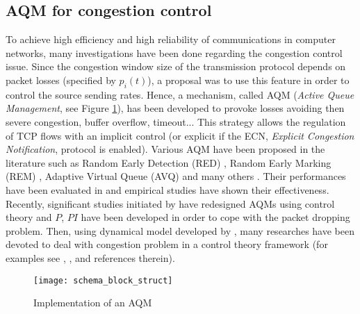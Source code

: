 \documentclass[a4paper, 10pt, onecolumn]{article}
\begin{document}
\subsection{AQM for congestion control}

To achieve high efficiency and high reliability of communications in computer networks, many investigations have been done regarding the congestion control issue. Since the congestion window size of the transmission protocol depends on packet losses (specified by $p_i(t)$), a proposal was to use this feature in order to control the source sending rates. Hence, a mechanism, called AQM ({\it Active Queue Management}, see Figure \ref{schema_block_struct}), has been developed to provoke losses avoiding then severe congestion, buffer overflow, timeout... This strategy allows the regulation of TCP flows with an implicit control (or explicit if the ECN, {\it Explicit Congestion Notification}, protocol is enabled). Various AQM have been proposed in the literature such as Random Early Detection (RED) \cite{Flo93}, Random Early Marking (REM) \cite{Ath00}, Adaptive Virtual Queue (AVQ) \cite{Sri04} and many others \cite{Ryu04}. Their performances have been evaluated in \cite{Ryu04} and empirical studies have shown their effectiveness. Recently, significant studies initiated by \cite{Hol02} have redesigned AQMs using control theory and $P$, $PI$ have been developed in order to cope with the packet dropping problem. Then, using dynamical model developed by \cite{Mis00}, many researches have been devoted to deal with congestion problem in a control theory framework (for examples see \cite{Lab07b}, \cite{Kim06}, \cite{Tar05} and references therein).

\begin{figure}
       \centerline{\texttt{[image: schema\_block\_struct]}}
       \caption{Implementation of an AQM}
       \label{schema_block_struct}
\end{figure}
\end{document}
